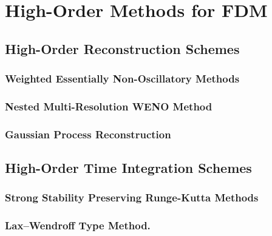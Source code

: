 \chapter{High-Order Methods for FDM}\label{chap:high_order_methods}




\section{High-Order Reconstruction Schemes}\label{sec:recons}

\subsection{Weighted Essentially Non-Oscillatory Methods}\label{subsec:weno}

\subsection{Nested Multi-Resolution WENO Method}\label{subsec:nestedweno}

\subsection{Gaussian Process Reconstruction}\label{subsec:gp}




\section{High-Order Time Integration Schemes}\label{sec:time_integration}

\subsection{Strong Stability Preserving Runge-Kutta Methods}\label{subsec:ssprk}

\subsection{Lax–Wendroff Type Method.}\label{subsec:laxwendroff}
